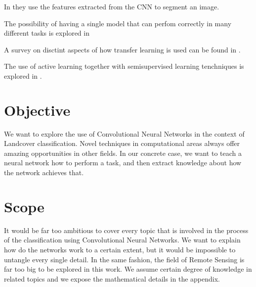 In \cite{DBLP:journals/corr/LongSD14} they use the features extracted from the CNN to segment an image.

The possibility of having a single model that can perfom correctly in many different tasks is explored in \cite{DBLP:journals/corr/KaiserGSVPJU17}

A survey on disctint aspects of how transfer learning is used can be found in \cite{5288526}.

The use of active learning together with semisupervised learning tenchniques is explored in \cite{7956153}.




\section{Objective}

We want to explore the use of Convolutional Neural Networks in the context of Landcover classification. Novel techniques in computational areas always offer amazing opportunities in other fields. In our concrete case, we want to teach a neural network how to perform a task, and then extract knowledge about how the network achieves that.\\



\section{Scope}

It would be far too ambitious to cover every topic that is involved in the process of the classification using Convolutional Neural Networks. We want to explain how do the networks work to a certain extent, but it would be impossible to untangle every single detail. In the same fashion, the field of Remote Sensing is far too big to be explored in this work. We assume certain degree of knowledge in related topics and we expose the mathematical details in the appendix.\\
